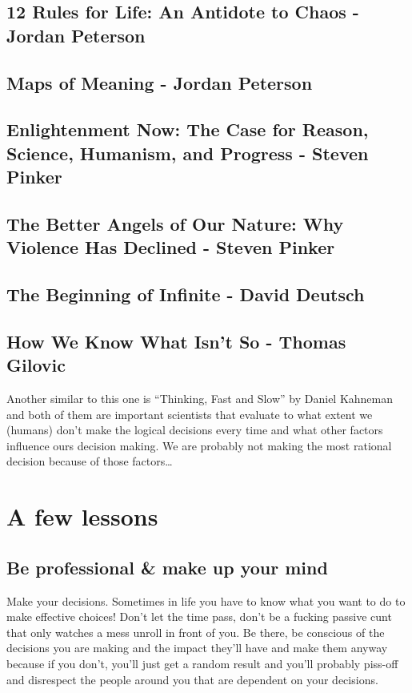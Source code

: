 \subsection{12 Rules for Life: An Antidote to Chaos - Jordan Peterson}

\subsection{Maps of Meaning - Jordan Peterson}

\subsection{Enlightenment Now: The Case for Reason, Science, Humanism, and Progress - Steven Pinker}

\subsection{The Better Angels of Our Nature: Why Violence Has Declined - Steven Pinker}

\subsection{The Beginning of Infinite - David Deutsch}

\subsection{How We Know What Isn't So - Thomas Gilovic}

Another similar to this one is ``Thinking, Fast and Slow'' by Daniel Kahneman and both of them are important scientists that evaluate to what extent we (humans) don't make the logical decisions every time and what other factors influence ours decision making. We are probably not making the most rational decision because of those factors\dots






\section{A few lessons}


\subsection{Be professional \& make up your mind}
Make your decisions. Sometimes in life you have to know what you want to do to make effective choices! Don't let the time pass, don't be a fucking passive cunt that only watches a mess unroll in front of you. Be there, be conscious of the decisions you are making and the impact they'll have and make them anyway because if you don't, you'll just get a random result and you'll probably piss-off and disrespect the people around you that are dependent on your decisions.


